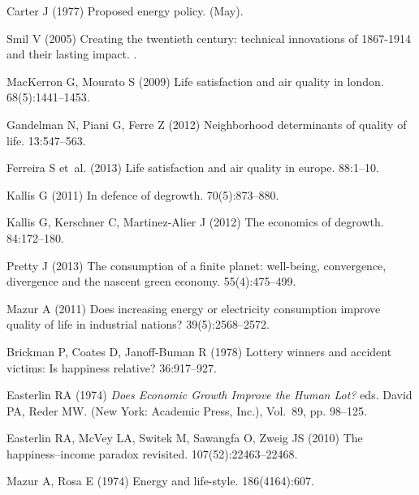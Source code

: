 \documentclass[10pt, letterpaper]{article}
\begin{document}
\begin{spacing}{1.4}
\begin{thebibliography}{10}
Carter J (1977) Proposed energy policy.
 (May).

Smil V (2005) Creating the twentieth century: technical innovations of
  1867-1914 and their lasting impact.
.

MacKerron G, Mourato S (2009) Life satisfaction and air quality in london.
 68(5):1441--1453.

Gandelman N, Piani G, Ferre Z (2012) Neighborhood determinants of quality of
  life.
 13:547--563.

Ferreira S et~al. (2013) Life satisfaction and air quality in europe.
 88:1--10.

Kallis G (2011) In defence of degrowth.
 70(5):873--880.

Kallis G, Kerschner C, Martinez-Alier J (2012) The economics of degrowth.
 84:172--180.

Pretty J (2013) The consumption of a finite planet: well-being, convergence,
  divergence and the nascent green economy.
 55(4):475--499.

Mazur A (2011) Does increasing energy or electricity consumption improve
  quality of life in industrial nations?
 39(5):2568--2572.

Brickman P, Coates D, Janoff-Buman R (1978) Lottery winners and accident
  victims: Is happiness relative?
 36:917--927.

Easterlin RA (1974) {\em Does Economic Growth Improve the Human Lot?} eds.{}
  David PA, Reder MW.
\newblock (New York: Academic Press, Inc.), Vol.{}~89, pp. 98--125.

Easterlin RA, McVey LA, Switek M, Sawangfa O, Zweig JS (2010) The
  happiness--income paradox revisited.
  107(52):22463--22468.

Mazur A, Rosa E (1974) Energy and life-style.
 186(4164):607.


\end{thebibliography}
\end{spacing}
\end{document}
